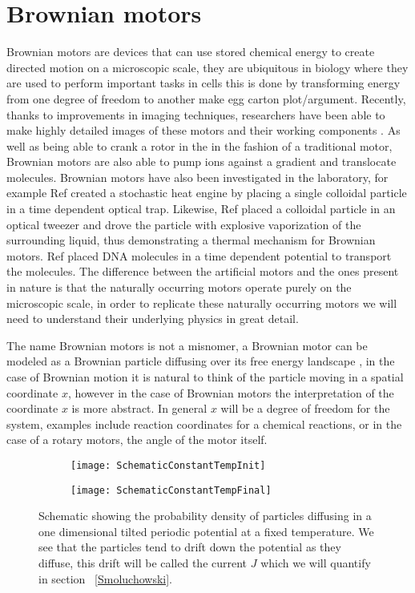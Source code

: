\section{Brownian motors}
Brownian motors are devices that can use stored chemical energy to create directed motion on a microscopic scale, they are ubiquitous in biology where they are used to perform important tasks in cells  \cite{PhillipsQuakeMay2006, Magnasco1994} this is done by transforming energy from one degree of freedom to another {\color{red} make egg carton plot/argument}. Recently, thanks to improvements in imaging techniques, researchers have been able to make highly detailed images of these motors and their working components \cite{YiWeiChang2016}. As well as being able to crank a rotor in the in the fashion of a traditional motor, Brownian motors are also able to pump ions against a gradient and translocate molecules. Brownian motors have also been investigated in the laboratory, for example Ref \cite{BlickleBechinger2011} created a stochastic heat engine by placing a single colloidal particle in a time dependent optical trap. Likewise, Ref \cite{Pedro2014} placed a colloidal particle in an optical tweezer and drove the particle with explosive vaporization of the surrounding liquid, thus demonstrating a thermal mechanism for Brownian motors. Ref \cite{JoelBader1999} placed DNA molecules in a time dependent potential to transport the molecules. The difference between the artificial motors and the ones present in nature is that the naturally occurring motors operate purely on the microscopic scale, in order to replicate these naturally occurring motors we will need to understand their underlying physics in great detail.

The name Brownian motors is not a misnomer, a Brownian motor can be modeled as a Brownian particle diffusing over its free energy landscape \cite{Reimann2001}, in the case of Brownian motion it is natural to think of the particle moving in a spatial coordinate $x$, however in the case of Brownian motors the interpretation of the coordinate $x$ is more abstract. In general $x$ will be a degree of freedom for the system, examples include reaction coordinates for a chemical reactions, or in the case of a rotary motors, the angle of the motor itself.

\begin{figure}[tb]
	\begin{subfigure}{0.49\textwidth}
		\texttt{[image: SchematicConstantTempInit]}
		\caption{\label{fig:Init}}
	\end{subfigure}
\begin{subfigure}{0.49\textwidth}
		\texttt{[image: SchematicConstantTempFinal]}
		\caption{\label{fig:Final}}
\end{subfigure}
\caption{Schematic showing the probability density of particles diffusing in a one dimensional tilted periodic potential at a fixed temperature. We see that the particles tend to drift down the potential as they diffuse, this drift will be called the current $J$ which we will quantify in section ~\autoref{Smoluchowski}.}
\label{fig:Schematic}
\end{figure}

